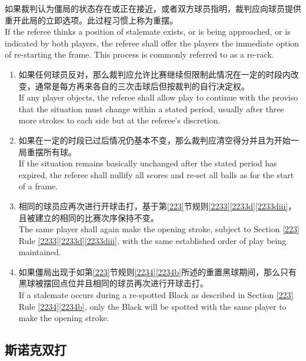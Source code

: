 \noindent 如果裁判认为僵局的状态存在或正在接近，或者双方球员指明，裁判应向球员提供重开此局的立即选项。此过程习惯上称为重摆。\\
If the referee thinks a position of stalemate exists, or is being approached, or is indicated by both players, the referee shall offer the players the immediate option of re-starting the frame. This process is commonly referred to as a re-rack.
\begin{enumerate}[label=(\alph*)]
    \item 如果任何球员反对，那么裁判应允许比赛继续但限制此情况在一定的时段内改变，通常是每方再来各自的三次击球后但按裁判的自行决定权。\\
    If any player objects, the referee shall allow play to continue with the proviso that the situation must change within a stated period, usually after three more strokes to each side but at the referee's discretion.
    \item 如果在一定的时段已过后情况仍基本不变，那么裁判应清空得分并且为开始一局重摆所有球。\\
    If the situation remains basically unchanged after the stated period has expired, the referee shall nullify all scores and re-set all balls as for the start of a frame.
    \item 相同的球员应再次进行开球击打，基于第\ref{223}节规则\ref{2233}\ref{2233d}\ref{2233diii}，且被建立的相同的比赛次序保持不变。\\
    The same player shall again make the opening stroke, subject to Section \ref{223} Rule \ref{2233}\ref{2233d}\ref{2233diii}, with the same established order of play being maintained.
    \item 如果僵局出现于如第\ref{223}节规则\ref{2234}\ref{2234b}所述的重置黑球期间，那么只有黑球被摆回点位并且相同的球员再次进行开球击打。\\
    If a stalemate occurs during a re-spotted Black as described in Section \ref{223} Rule \ref{2234}\ref{2234b}, only the Black will be spotted with the same player to make the opening stroke.
\end{enumerate}

\subsection{斯诺克双打}\label{22318}

